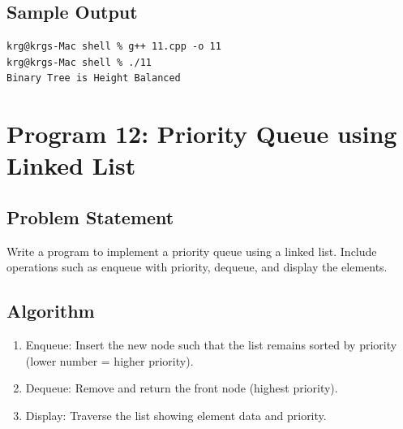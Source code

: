 \documentclass[a4paper,12pt]{article}
\begin{document}
\subsection*{Sample Output}
\begin{lstlisting}[style=outputstyle]
krg@krgs-Mac shell % g++ 11.cpp -o 11
krg@krgs-Mac shell % ./11
Binary Tree is Height Balanced
\end{lstlisting}

\newpage

\section*{Program 12: Priority Queue using Linked List}

\subsection*{Problem Statement}
Write a program to implement a priority queue using a linked list. Include operations such as enqueue with priority, dequeue, and display the elements.

\subsection*{Algorithm}
\begin{enumerate}
    \item Enqueue: Insert the new node such that the list remains sorted by priority (lower number = higher priority).
    \item Dequeue: Remove and return the front node (highest priority).
    \item Display: Traverse the list showing element data and priority.
\end{enumerate}
\end{document}

